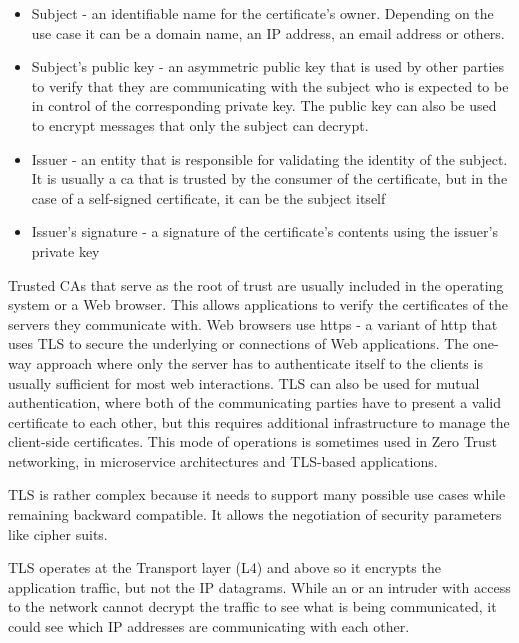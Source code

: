 \begin{itemize}
\tightlist
\item
  Subject - an identifiable name for the certificate's owner. Depending
  on the use case it can be a domain name, an IP address, an email
  address or others.
\item
  Subject's public key - an asymmetric public key that is used by other
  parties to verify that they are communicating with the subject who is
  expected to be in control of the corresponding private key. The public
  key can also be used to encrypt messages that only the subject can
  decrypt.
\item
  Issuer - an entity that is responsible for validating the identity of
  the subject. It is usually a \gls{ca} that is trusted by the consumer
  of the certificate, but in the case of a self-signed certificate, it
  can be the subject itself
\item
  Issuer's signature - a signature of the certificate's contents using
  the issuer's private key
\end{itemize}

Trusted CAs that serve as the root of trust are usually included in the
operating system or a Web browser. This allows applications to verify
the certificates of the servers they communicate with. Web browsers use
\gls{https} \autocite{httpsRFC} - a variant of \gls{http} that uses TLS
to secure the underlying  or 
connections of Web applications. The one-way approach where only the
server has to authenticate itself to the clients is usually sufficient
for most web interactions. TLS can also be used for mutual
authentication, where both of the communicating parties have to present
a valid certificate to each other, but this requires additional
infrastructure to manage the client-side certificates. This mode of
operations is sometimes used in Zero Trust networking, in microservice
architectures and TLS-based  applications.

TLS is rather complex because it needs to support many possible use
cases while remaining backward compatible. It allows the negotiation of
security parameters like cipher suits.

TLS operates at the Transport layer (L4) and above so it encrypts the
application traffic, but not the IP datagrams. While an
 or an intruder with access to the network cannot
decrypt the traffic to see what is being communicated, it could see
which IP addresses are communicating with each other.

